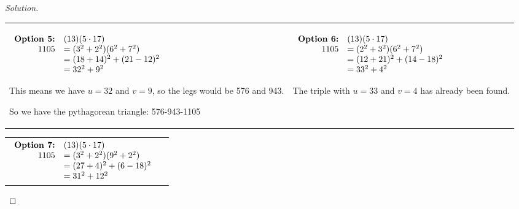 \documentclass[11pt]{article}
\newenvironment{solution}
  {\renewcommand\qedsymbol{$~$}\begin{proof}[Solution]$ $\par\nobreak\ignorespaces}
  {\end{proof}}
\begin{document}
\begin{solution}
  \begin{center}
    \begin{NiceTabular}[width=0.95\textwidth]{X[l] !{\qquad} X[l]}
      \begin{math}
        \begin{array}[t]{rl}
          \textbf{Option 5:} & (13)(5\cdot 17)         \\
          1105               & =  (3^2+2^2)(6^2+7^2)   \\
                             & = (18+14)^2 + (21-12)^2 \\
                             & = 32^2 + 9^2
        \end{array}
      \end{math}

      This means we have $u=32$ and $v=9$, so the legs would be 576 and 943.

      So we have the pythagorean triangle:
      576-943-1105

       &
      \begin{math}
        \begin{array}[t]{rl}
          \textbf{Option 6:} & (13)(5\cdot 17)         \\
          1105               & =  (2^2+3^2)(6^2+7^2)   \\
                             & = (12+21)^2 + (14-18)^2 \\
                             & = 33^2 + 4^2            \\
        \end{array}
      \end{math}

      The triple with $u=33$ and $v=4$ has already been found.
      \\
    \end{NiceTabular}
  \end{center}

  \begin{center}
    \begin{NiceTabular}[width=0.95\textwidth]{X[l] !{\qquad} X[l]}
      \begin{math}
        \begin{array}[t]{rl}
          \textbf{Option 7:} & (13)(5\cdot 17)       \\
          1105               & =  (3^2+2^2)(9^2+2^2) \\
                             & = (27+4)^2 + (6-18)^2 \\
                             & = 31^2 + 12^2
        \end{array}
      \end{math}


\end{NiceTabular}
\end{center}
\end{solution}
\end{document}
